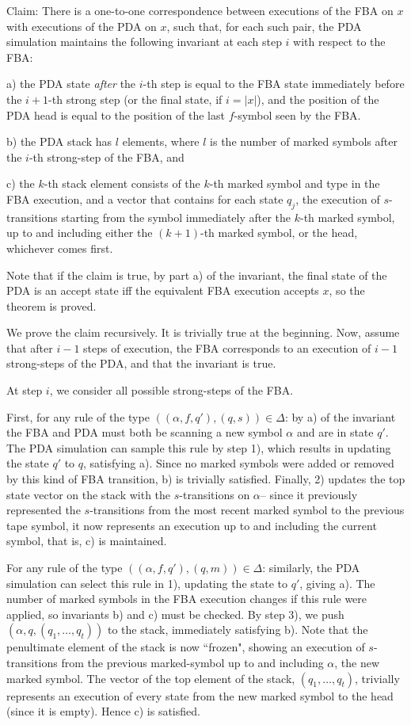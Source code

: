 \documentclass[11pt]{article}
\begin{document}
Claim: There is a one-to-one correspondence between executions of the FBA on $x$ with executions of the PDA on $x$, such that, for each such pair, the PDA simulation maintains the following invariant at each step $i$ with respect to the FBA:

a) the PDA state {\em after} the $i$-th step is equal to the FBA state immediately before the $i+1$-th strong step (or the final state, if $i=|x|$), and the position of the PDA head is equal to the position of the last $f$-symbol seen by the FBA.

b) the PDA stack has $l$ elements, where $l$ is the number of marked symbols after the $i$-th strong-step of the FBA, and 

c) the $k$-th stack element consists of the $k$-th marked symbol and type in the FBA execution, and a vector that contains for each state $q_j$, the execution of $s$-transitions starting from the symbol immediately after the $k$-th marked symbol, up to and including either the $(k+1)$-th marked symbol, or the head, whichever comes first.

Note that if the claim is true, by part a) of the invariant, the final state of the PDA is an accept state iff the equivalent FBA execution accepts $x$, so the theorem is proved.

We prove the claim recursively. It is trivially true at the beginning. Now, assume that after $i-1$ steps of execution, the FBA corresponds to an execution of $i-1$ strong-steps of the PDA, and that the invariant is true.

At step $i$, we consider all possible strong-steps of the FBA.

First, for any rule of the type $((\alpha,f,q'),(q,s)) \in \Delta$: by a) of the invariant the FBA and PDA must both be scanning a new symbol $\alpha$ and are in state $q'$. The PDA simulation can sample this rule by step 1), which results in updating the state $q'$ to $q$, satisfying a). Since no marked symbols were added or removed by this kind of FBA transition, b) is trivially satisfied. Finally, 2) updates the top state vector on the stack with the $s$-transitions on $\alpha$-- since it previously represented the $s$-transitions from the most recent marked symbol to the previous tape symbol, it now represents an execution up to and including the current symbol, that is, c) is maintained.

For any rule of the type $((\alpha,f,q'),(q,m)) \in \Delta$: similarly, the PDA simulation can select this rule in 1), updating the state to $q'$, giving a). The number of marked symbols in the FBA execution changes if this rule were applied, so invariants b) and c) must be checked. By step 3), we push $(\alpha, q, (q_1,\ldots,q_t))$ to the stack, immediately satisfying b). Note that the penultimate element of the stack is now ``frozen", showing an execution of $s$-transitions from the previous marked-symbol up to and including $\alpha$, the new marked symbol. The vector of the top element of the stack, $(q_1,\ldots,q_t)$, trivially represents an execution of every state from the new marked symbol to the head (since it is empty). Hence c) is satisfied.
\end{document}
